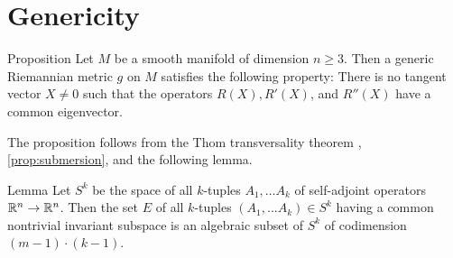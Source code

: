 \documentclass[a4paper,10pt]{article}
\begin{document}
\section{Genericity}

\begin{thm}{Proposition}
Let $M$ be a smooth manifold of dimension $n\ge 3$.
Then a generic Riemannian metric $g$ on $M$ satisfies the following property:
There is no tangent vector $X\ne 0$ such that the operators
$R(X), R'(X)$, and $R''(X)$ have a common eigenvector.
\end{thm}

The proposition follows from the Thom transversality theorem \cite[2.3.2]{eliashberg-mishachev}, \ref{prop:submersion}, and the following lemma.


\begin{thm}{Lemma}
Let $S^k$ be the space of all $k$-tuples $A_1,\dots A_k$ of self-adjoint operators $\mathbb{R}^n\to\mathbb{R}^n$.
Then the set $E$ of all $k$-tuples $(A_1,...A_k) \in S^k$  having a common nontrivial invariant subspace is an algebraic subset of $S^k$ of codimension $(m-1)\cdot (k-1)$.
\end{thm}

\qeds




\end{document}
